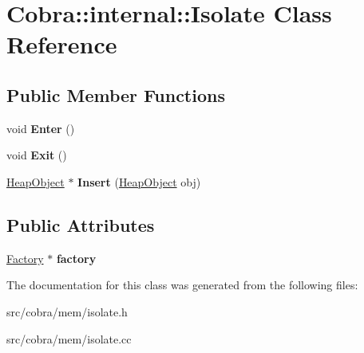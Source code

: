 \hypertarget{class_cobra_1_1internal_1_1_isolate}{\section{Cobra\+:\+:internal\+:\+:Isolate Class Reference}
\label{class_cobra_1_1internal_1_1_isolate}
}
\subsection*{Public Member Functions}
\begin{DoxyCompactItemize}
\item 
\hypertarget{class_cobra_1_1internal_1_1_isolate_abc6ce041311035d0e917119f6498d2db}{void {\bfseries Enter} ()}\label{class_cobra_1_1internal_1_1_isolate_abc6ce041311035d0e917119f6498d2db}

\item 
\hypertarget{class_cobra_1_1internal_1_1_isolate_aa966378a720680a07228f9a373ede884}{void {\bfseries Exit} ()}\label{class_cobra_1_1internal_1_1_isolate_aa966378a720680a07228f9a373ede884}

\item 
\hypertarget{class_cobra_1_1internal_1_1_isolate_a9dce7bc569dfe1265e0bf4bb0eabc8b6}{\hyperlink{struct_cobra_1_1internal_1_1_heap_object}{Heap\+Object} $\ast$ {\bfseries Insert} (\hyperlink{struct_cobra_1_1internal_1_1_heap_object}{Heap\+Object} obj)}\label{class_cobra_1_1internal_1_1_isolate_a9dce7bc569dfe1265e0bf4bb0eabc8b6}

\end{DoxyCompactItemize}
\subsection*{Public Attributes}
\begin{DoxyCompactItemize}
\item 
\hypertarget{class_cobra_1_1internal_1_1_isolate_a29719d0436322bc0e85817c9648769b0}{\hyperlink{class_cobra_1_1internal_1_1_factory}{Factory} $\ast$ {\bfseries factory}}\label{class_cobra_1_1internal_1_1_isolate_a29719d0436322bc0e85817c9648769b0}

\end{DoxyCompactItemize}


The documentation for this class was generated from the following files\+:\begin{DoxyCompactItemize}
\item 
src/cobra/mem/isolate.\+h\item 
src/cobra/mem/isolate.\+cc\end{DoxyCompactItemize}
